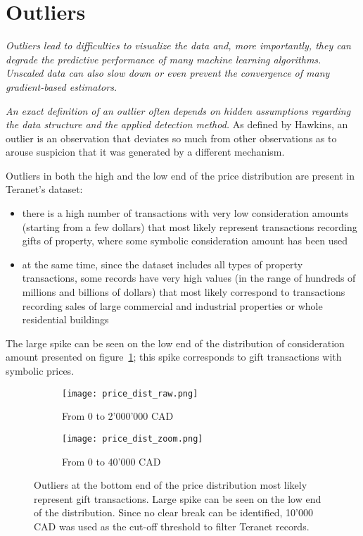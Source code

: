 \section{Outliers} \label{sec:outliers}

\textit{Outliers lead to difficulties to visualize the data and, more importantly, they can degrade the predictive performance of many machine learning algorithms. Unscaled data can also slow down or even prevent the convergence of many gradient-based estimators.}\cite{Scikit-learndevelopers2019b}

\textit{An exact definition of an outlier often depends on hidden assumptions regarding the data structure and the applied detection method.}\cite{Ben-Gal2005}
As defined by Hawkins, an outlier is an observation that deviates so much from other observations as to arouse suspicion that it was generated by a different mechanism\cite{Hawkins1980}.

Outliers in both the high and the low end of the price distribution are present in Teranet's dataset:
\begin{itemize}
    \item there is a high number of transactions with very low consideration amounts (starting from a few dollars) that most likely represent transactions recording gifts of property, where some symbolic consideration amount has been used
    \item at the same time, since the dataset includes all types of property transactions, some records have very high values (in the range of hundreds of millions and billions of dollars) that most likely correspond to transactions recording sales of large commercial and industrial properties or whole residential buildings
\end{itemize}

The large spike can be seen on the low end of the distribution of consideration amount presented on figure~\ref{fig:bottom_outliers}; this spike corresponds to gift transactions with symbolic prices.
\begin{figure}[ht]
    \centering
    \begin{subfigure}{\linewidth}
        \centering
        \texttt{[image: price\_dist\_raw.png]}
        \caption{From 0 to 2'000'000 CAD}
    \end{subfigure}

    \begin{subfigure}{\linewidth}
        \centering
        \texttt{[image: price\_dist\_zoom.png]}
        \caption{From 0 to 40'000 CAD}
    \end{subfigure}
    \caption{Outliers at the bottom end of the price distribution most likely represent gift transactions.
    Large spike can be seen on the low end of the distribution.
    Since no clear break can be identified, 10'000 CAD was used as the cut-off threshold to filter Teranet records.}
    \label{fig:bottom_outliers}
\end{figure}

